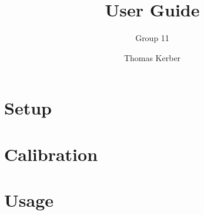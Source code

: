 \documentclass[a4paper]{scrartcl}
\author{Thomas Kerber}
\title{User Guide}
\subtitle{Group 11}
\begin{document}
\maketitle
\section{Setup}
\section{Calibration}
\section{Usage}
\end{document}
